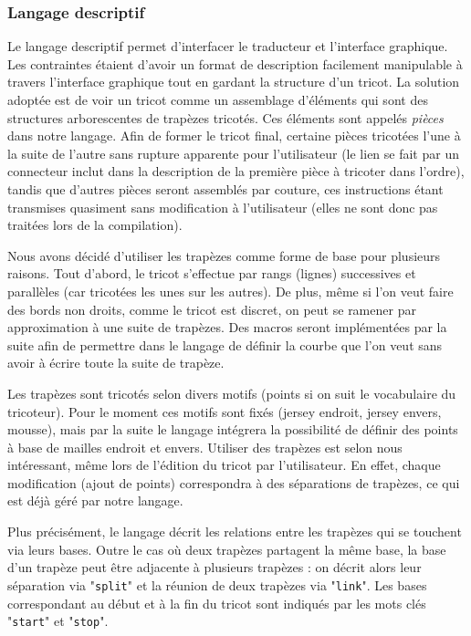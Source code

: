 \documentclass{article}
\begin{document}


\subsubsection{Langage descriptif}

Le langage descriptif permet d'interfacer le traducteur et l'interface graphique. Les contraintes étaient d'avoir un format de description facilement manipulable à travers l'interface graphique tout en gardant la structure d'un tricot. La solution adoptée est de voir un tricot comme un assemblage d'éléments qui sont des structures arborescentes de trapèzes tricotés. Ces éléments sont appelés \emph{pièces} dans notre langage. Afin de former le tricot final, certaine pièces tricotées l'une à la suite de l'autre sans rupture apparente pour l'utilisateur (le lien se fait par un connecteur inclut dans la description de la première pièce à tricoter dans l'ordre), tandis que d'autres pièces seront assemblés par couture, ces instructions étant transmises quasiment sans modification à l'utilisateur (elles ne sont donc pas traitées lors de la compilation).

Nous avons décidé d'utiliser les trapèzes comme forme de base pour plusieurs raisons. Tout d'abord, le tricot s'effectue par rangs (lignes) successives et parallèles (car tricotées les unes sur les autres). De plus, même si l'on veut faire des bords non droits, comme le tricot est discret, on peut se ramener par approximation à une suite de trapèzes. Des macros seront implémentées par la suite afin de permettre dans le langage de définir la courbe que l'on veut sans avoir à écrire toute la suite de trapèze.

Les trapèzes sont tricotés selon divers motifs (points si on suit le vocabulaire du tricoteur). Pour le moment ces motifs sont fixés (jersey endroit, jersey envers, mousse), mais par la suite le langage intégrera la possibilité de définir des points à base de mailles endroit et envers. Utiliser des trapèzes est selon nous intéressant, même lors de l'édition du tricot par l'utilisateur. En effet, chaque modification (ajout de points) correspondra à des séparations de trapèzes, ce qui est déjà géré par notre langage.

Plus précisément, le langage décrit les relations entre les trapèzes qui se touchent via leurs bases. Outre le cas où deux trapèzes partagent la même base, la base d'un trapèze peut être adjacente à plusieurs trapèzes : on décrit alors leur séparation via "\texttt{split}" et la réunion de deux trapèzes via "\texttt{link}". Les bases correspondant au début et à la fin du tricot sont indiqués par les mots clés "\texttt{start}" et "\texttt{stop}".
\end{document}
